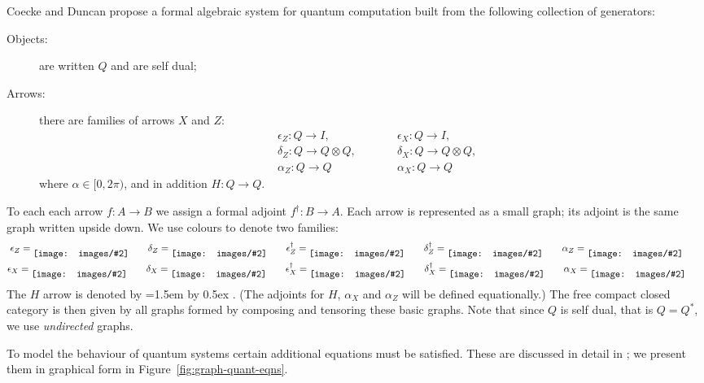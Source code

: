 \documentclass[runningheads]{llncs}
\newcommand{\inlinegraphic}[2]{
  \dimendef\grafheight=255\dimendef\grafvshift=254
  \grafheight=#1
  \grafvshift=-0.5\grafheight
  \advance\grafvshift by 0.5ex
  \raisebox{\grafvshift}{\texttt{[image: images/\#2]}\xspace}
}
\begin{document}
Coecke and Duncan \cite{Coecke:2008jo} propose a formal algebraic
system for quantum computation built from the following collection of
generators:  
\begin{description}
\item[Objects:] are written $Q$ and are self dual;
\item[Arrows:] there are families of arrows $X$ and $Z$:
  \begin{align*}
  &\epsilon_Z : Q \to I, &\qquad&  \epsilon_X : Q \to I,\\
  &\delta_Z : Q \to Q \otimes Q, && \delta_X : Q \to Q \otimes Q, \\
  &\alpha_Z : Q \to Q &&  \alpha_X : Q \to Q   
  \end{align*}
  where $\alpha \in [0,2\pi)$, and in addition $H:Q\to Q$.
\end{description}
To each each arrow $f : A\to B$ we assign a formal adjoint $f^\dag : B
\to A$.  Each arrow is represented as a small graph; its adjoint is
the same graph written upside down.  We use colours to denote two families:
\begin{gather*}
  \epsilon_Z = \inlinegraphic{1.5em}{epsilon} \qquad
  \delta_Z = \inlinegraphic{1.5em}{delta} \qquad
  \epsilon_Z^\dag = \inlinegraphic{1.5em}{epsilondag} \qquad
  \delta_Z^\dag = \inlinegraphic{1.5em}{deltadag} \qquad
  \alpha_Z = \inlinegraphic{1.5em}{greenalpha} \qquad
\\  
  \epsilon_X = \inlinegraphic{1.5em}{redepsilon} \qquad
  \delta_X = \inlinegraphic{1.5em}{reddelta} \qquad
  \epsilon_X^\dag = \inlinegraphic{1.5em}{redepsilondag} \qquad
  \delta_X^\dag = \inlinegraphic{1.5em}{reddeltadag} \qquad
  \alpha_X = \inlinegraphic{1.5em}{redalpha} \qquad
\end{gather*}
The $H$ arrow is denoted by \inlinegraphic{1.5em}{H}.  (The adjoints
for $H$, $\alpha_X$ and $\alpha_Z$ will be defined equationally.)  The
free compact closed category is then given by all graphs formed by
composing and tensoring these basic graphs.  Note  that since $Q$ is
self dual, that is $Q = Q^*$, we use \emph{undirected} graphs.

To model the behaviour of quantum systems certain additional equations
must be satisfied.  These are discussed in detail in
\cite{Coecke:2008jo};  we present them in graphical form in
Figure~\ref{fig:graph-quant-eqns}.
\end{document}
